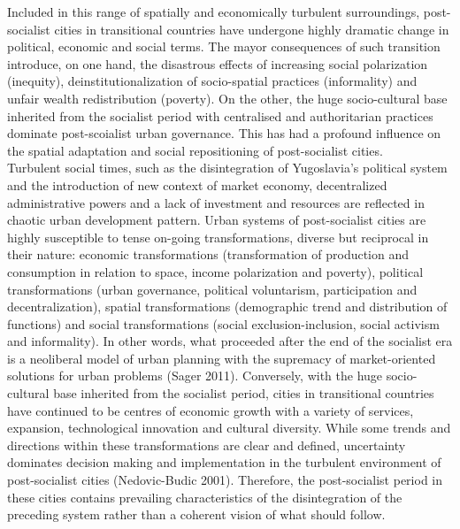 \documentclass[11pt]{report}
\begin{document}
Included in this range of spatially and economically turbulent surroundings, post-socialist cities in transitional countries have undergone highly dramatic change in political, economic and social terms. The mayor consequences of such transition introduce, on one hand, the disastrous effects of increasing social polarization (inequity), deinstitutionalization of socio-spatial practices (informality) and unfair wealth redistribution (poverty). On the other, the huge socio-cultural base inherited from the socialist period with centralised and authoritarian practices dominate post-scoialist urban governance. This has had a profound influence on the spatial adaptation and social repositioning of post-socialist cities.
\\
Turbulent social times, such as the disintegration of Yugoslavia’s political system and the introduction of new context of market economy, decentralized administrative powers and a lack of investment and resources are reflected in chaotic urban development pattern. Urban systems of post-socialist cities are highly susceptible to tense on-going transformations, diverse but reciprocal in their nature: economic transformations (transformation of production and consumption in relation to space, income polarization and poverty), political transformations (urban governance, political voluntarism, participation and decentralization), spatial transformations (demographic trend and distribution of functions) and social transformations (social exclusion-inclusion, social activism and informality). In other words, what proceeded after the end of the socialist era is a neoliberal model of urban planning with the supremacy of market-oriented solutions for urban problems (Sager 2011). Conversely, with the huge socio-cultural base inherited from the socialist period, cities in transitional countries have continued to be centres of economic growth with a variety of services, expansion, technological innovation and cultural diversity. While some trends and directions within these transformations are clear and defined, uncertainty dominates decision making and implementation in the turbulent environment of post-socialist cities (Nedovic-Budic 2001). Therefore, the post-socialist period in these cities contains prevailing characteristics of the disintegration of the preceding system rather than a coherent vision of what should follow. 
\\
\end{document}
